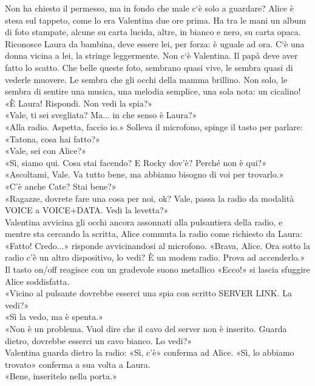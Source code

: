 \par\medskip
Non ha chiesto il permesso, ma in fondo che male c`\`e solo a guardare? Alice \`e stesa sul tappeto, come lo era Valentina due ore prima. Ha tra le mani
un album di foto stampate, alcune su carta lucida, altre, in bianco e nero, su carta opaca. Riconosce Laura da bambina, deve essere lei, per forza: \`e uguale ad ora. C`\`e una donna vicina a lei, la stringe leggermente. Non c`\`e Valentina. Il papà deve aver fatto lo scatto. Che belle queste foto, sembrano quasi vive, le sembra quasi di vederle muovere. Le sembra che gli occhi della mamma brillino. Non solo, le sembra di sentire una  musica, una melodia semplice, una sola nota: un cicalino! \\
«\`E Laura! Rispondi. Non vedi la spia?»\\
«Vale, ti sei svegliata? Ma... in che senso \`e Laura?»\\
«Alla radio. Aspetta, faccio io.» Solleva il microfono, spinge il tasto per parlare: «Tatona, cosa hai fatto?»\\
«Vale, sei con Alice?»\\
«Sì, siamo qui. Cosa stai facendo? E Rocky dov’\`e? Perché non \`e qui?»\\
«Ascoltami, Vale. Va tutto bene, ma abbiamo bisogno di voi per trovarlo.»\\
«C’\`e anche Cate? Stai bene?»\\
«Ragazze, dovrete fare una cosa per noi, ok? Vale, passa la radio da modalità VOICE a VOICE+DATA. Vedi la levetta?»\\
Valentina avvicina gli occhi ancora assonnati alla pulsantiera della radio, e mentre sta cercando la scritta, Alice commuta la radio come richiesto da Laura: «Fatto! Credo...» risponde avvicinandosi al microfono. «Brava, Alice. Ora sotto la radio c'\`e un altro dispositivo, lo vedi? \`E un modem radio. Prova ad accenderlo.»\\
Il tasto on/off reagisce con un gradevole suono metallico «Ecco!» si lascia sfuggire Alice soddisfatta.\\
«Vicino al pulsante dovrebbe esserci una spia con scritto SERVER LINK. La vedi?»\\
«Sì la vedo, ma \`e spenta.»\\
«Non \`e un problema. Vuol dire che il cavo del server non \`e inserito. Guarda dietro, dovrebbe esserci un cavo bianco. Lo vedi?»\\
Valentina guarda dietro la radio: «Sì, c'\`e» conferma ad Alice. «Sì, lo abbiamo trovato»  conferma a sua volta a Laura.\\
«Bene, inseritelo nella porta.»\\



